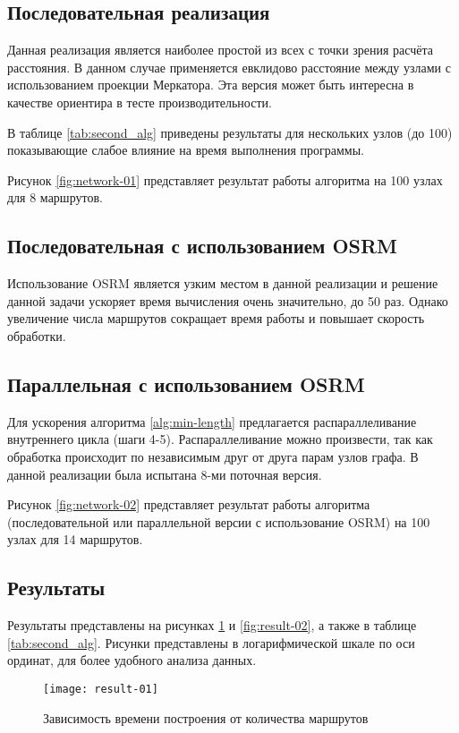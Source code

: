 \subsection{Последовательная реализация}
Данная реализация является наиболее простой из всех с точки зрения расчёта расстояния. В данном случае 
применяется евклидово расстояние между узлами с использованием проекции Меркатора. Эта версия может быть 
интересна в качестве ориентира в тесте производительности.

В таблице \ref{tab:second_alg} приведены результаты для нескольких узлов (до 100) показывающие слабое влияние 
на время выполнения программы.

Рисунок \ref{fig:network-01} представляет результат работы алгоритма на 100 узлах для 8 маршрутов.

\subsection{Последовательная с использованием OSRM}
Использование OSRM является узким местом в данной реализации и решение данной задачи ускоряет время 
вычисления очень значительно, до 50 раз. Однако увеличение числа маршрутов сокращает время работы и повышает 
скорость обработки.

\subsection{Параллельная с использованием OSRM}
Для ускорения алгоритма \ref{alg:min-length} предлагается распараллеливание внутреннего цикла (шаги 4-5).
Распараллеливание можно произвести, так как обработка происходит по независимым друг от друга парам узлов 
графа. В данной реализации была испытана 8-ми поточная версия.

Рисунок \ref{fig:network-02} представляет результат работы алгоритма (последовательной или параллельной 
версии с использование OSRM) на 100 узлах для 14 маршрутов.

\subsection{Результаты}
Результаты представлены на рисунках \ref{fig:result-01} и \ref{fig:result-02}, а также в таблице 
\ref{tab:second_alg}. Рисунки представлены в логарифмической шкале по оси ординат, для более удобного 
анализа данных.

\begin{figure}[ht!]
    \centering
    \texttt{[image: result-01]}
    \caption{Зависимость времени построения от количества маршрутов}
    \label{fig:result-01}
\end{figure}

